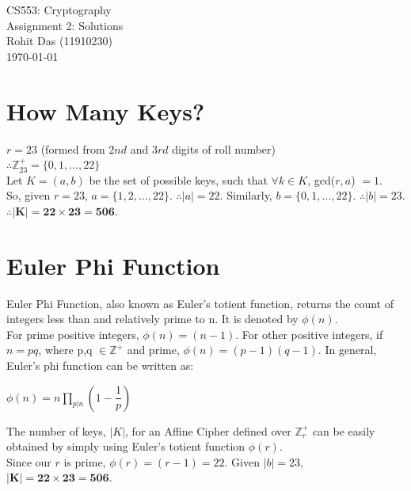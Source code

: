 \documentclass[12pt]{article}
\begin{document}
\begin{titlepage}
\centering
\vspace*{\fill}
\huge CS553: Cryptography\\
\LARGE Assignment 2: Solutions\\
\Large Rohit Das (11910230)\\\vspace{0.8cm}
\today
\vspace*{\fill}
\end{titlepage}

\section{How Many Keys?}
\begin{large}
$r = 23$ (formed from $2nd$ and $3rd$ digits of roll number)\\
$\therefore \mathbb{Z}^{+}_{23} = \{0,1,...,22\}$\\
Let $K = (a,b)$ be the set of possible keys, such that $\forall	k \in K$, gcd($r,a$) $= 1$.\\
So, given $r = 23$, $a = \{1,2,...,22\}$. $\therefore |a| = 22$. Similarly, $b = \{0,1,...,22\}$. $\therefore |b| = 23$. $\mathbf{\therefore |K| = 22\times 23 = 506}$.
\end{large}

\section{Euler Phi Function}
\begin{large}
Euler Phi Function, also known as Euler's totient function, returns the count of integers less than and relatively prime to n. It is denoted by $\phi(n)$.\\
For prime positive integers, $\phi(n) = (n - 1)$. For other positive integers, if $n = pq$, where p,q $\in \mathbb{Z}^{+}$ and prime, $\phi(n) = (p - 1)(q - 1)$. In general, Euler's phi function can be written as:
\begin{center}
$\phi(n) = n\displaystyle\prod_{p|n}\left(1 - \dfrac{1}{p}\right)$
\end{center}

The number of keys, $|K|$, for an Affine Cipher defined over $\mathbb{Z}^{+}_{r}$ can be easily obtained by simply using Euler's totient function $\phi(r)$.\\
Since our $r$ is prime, $\phi(r) = (r - 1) = 22$. Given $|b| = 23$, $\mathbf{|K| = 22 \times 23 = 506}$.
\end{large}
\end{document}
